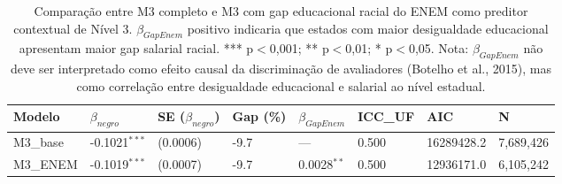 \begin{table}
\caption{Comparação entre M3 completo e M3 com gap educacional racial do ENEM como preditor contextual de Nível 3. $\beta_{GapEnem}$ positivo indicaria que estados com maior desigualdade educacional apresentam maior gap salarial racial. *** p$<$0,001; ** p$<$0,01; * p$<$0,05. Nota: $\beta_{GapEnem}$ não deve ser interpretado como efeito causal da discriminação de avaliadores (Botelho et al., 2015), mas como correlação entre desigualdade educacional e salarial ao nível estadual.}
\label{tab:enem_contextual}
\begin{tabular}{llllllll}
\toprule
Modelo & $\beta_{negro}$ & SE ($\beta_{negro}$) & Gap (\%) & $\beta_{GapEnem}$ & ICC\_UF & AIC & N \\
\midrule
M3_base & -0.1021$^{***}$ & (0.0006) & -9.7 & — & 0.500 & 16289428.2 & 7,689,426 \\
M3_ENEM & -0.1019$^{***}$ & (0.0007) & -9.7 & 0.0028$^{**}$ & 0.500 & 12936171.0 & 6,105,242 \\
\bottomrule
\end{tabular}
\end{table}

